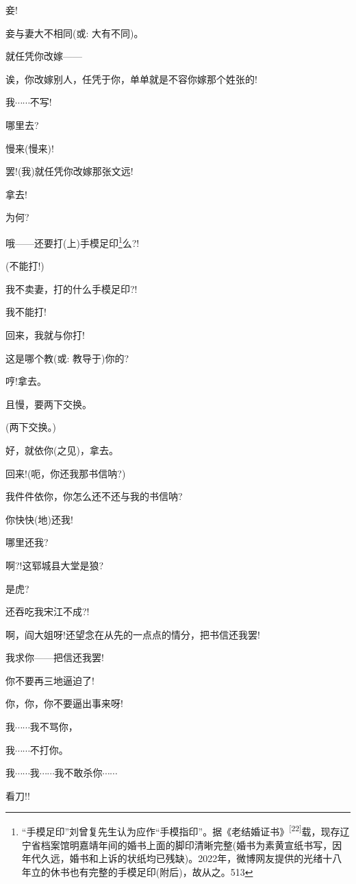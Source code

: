 {妾!}

{妾与妻大不相同({\akai 或}: 大有不同)。}

{就任凭你改嫁------}

{诶，你改嫁别人，任凭于你，单单就是不容你嫁那个姓张的!}

{我$\cdots{}\cdots{}$不写!}

{哪里去?}

{慢来(慢来)!}

{罢!(我)就任凭你改嫁那张文远!}

{拿去!}

{为何?}

{哦------还要打(上)手模足印}\footnote{ ``手模足印''刘曾复先生认为应作``手模指印''。据《老结婚证书》\textsuperscript{{[}22{]}}载，现存辽宁省档案馆明嘉靖年间的婚书上面的脚印清晰完整(婚书为素黄宣纸书写，因年代久远，婚书和上诉的状纸均已残缺)。2022年，微博网友提供的光绪十八年立的休书也有完整的手模足印(附后)，故从之。{513}}{么?!}

{(不能打!)}

{我不卖妻，打的什么手模足印?!}

{我不能打!}

{回来，我就与你打!}

{这是哪个教({\akai 或}: 教导于)你的?}

{哼!拿去。}

{且慢，要两下交换。}

{(两下交换。)}

{好，就依你(之见)，拿去。}

{回来!(呃，你还我那书信呐?)}

{我件件依你，你怎么还不还与我的书信呐?}

{你快快(地)还我!}

{哪里还我?}

{啊?!这郓城县大堂是狼?}

{是虎?}

{还吞吃我宋江不成?!}

{啊，阎大姐呀!还望念在从先的一点点的情分，把书信还我罢!}

{我求你------把信还我罢!}

{你不要再三地逼迫了!}

{你，你，你不要逼出事来呀!}

{我$\cdots{}\cdots{}$我不骂你，}

{我$\cdots{}\cdots{}$不打你。}

{我$\cdots{}\cdots{}$我$\cdots{}\cdots{}$我不敢杀你$\cdots{}\cdots{}$}

{看刀!!}

